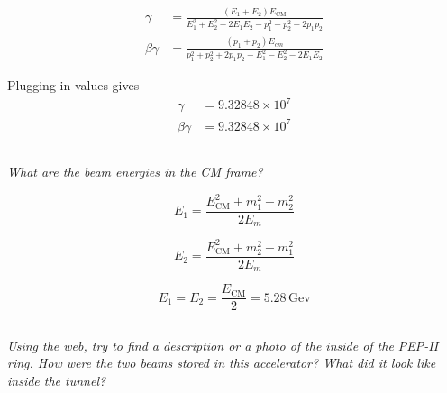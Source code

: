 \documentclass{article}
\begin{document}
\begin{align*}
    \gamma&=\frac{\left(E_{1}+E_{2}\right) E_{\mathrm{CM}}}{E_{1}^{2}+E_{2}^{2}+2 E_{1} E_{2}-p_{1}^{2}-p_{2}^{2}-2 p_{1} p_{2}}\\
    \beta \gamma&=\frac{\left(p_{1}+p_{2}\right) E_{c m}}{p_{1}^{2}+p_{2}^{2}+2 p_{1} p_{2}-E_{1}^{2}-E_{2}^{2}-2 E_{1} E_{2}}
\end{align*}

Plugging in values gives 
\begin{align*}
\gamma&=9.32848 \times 10^{7} \\
\beta \gamma& =9.32848 \times 10^{7}
\end{align*}

\subsection{}
\textit{What are the beam energies in the CM frame?}

\begin{equation*}
    E_{1}=\frac{E_{\mathrm{C M}}^{2}+m_{1}^{2}-m_{2}^{2}}{2 E_{m}}
\end{equation*}

\begin{equation*}
    E_{2}=\frac{E_{\mathrm{C M}}^{2}+m_{2}^{2}-m_{1}^{2}}{2 E_{m}}
\end{equation*}

$$
E_{1}=E_{2}=\frac{E_{\mathrm{CM}}}{2} =5.28 \, \mathrm{Gev}
$$

\subsection{}
\textit{Using the web, try to find a description or a photo of the inside of the PEP-II ring. How were the two beams stored in this accelerator? What did it look like inside the tunnel?}
\end{document}
